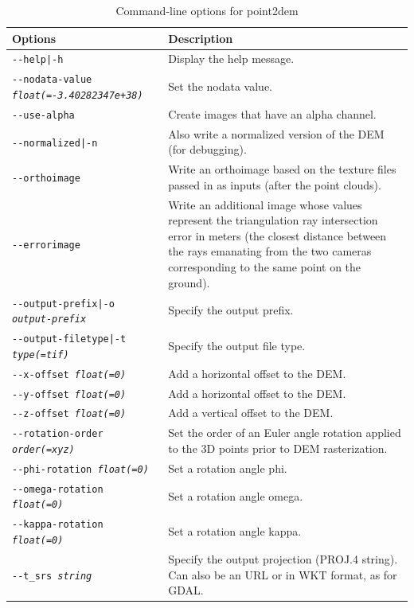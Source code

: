 \begin{longtable}{|p{8cm}|p{9cm}|}
\caption{Command-line options for point2dem}
\label{tbl:point2dem}
\endfirsthead
\endhead
\endfoot
\endlastfoot
\hline
Options & Description \\ \hline \hline
\texttt{-\/-help|-h} & Display the help message. \\ \hline
\texttt{-\/-nodata-value \textit{float(=-3.40282347e+38)}} & Set the nodata value. \\ \hline
\texttt{-\/-use-alpha} & Create images that have an alpha channel. \\ \hline
\texttt{-\/-normalized|-n} & Also write a normalized version of the \ac{DEM} (for debugging). \\ \hline
\texttt{-\/-orthoimage} & Write an orthoimage based on the texture files passed in as inputs (after the point clouds). \\ \hline
\texttt{-\/-errorimage} & Write an additional image whose values represent the triangulation ray intersection error in meters (the closest distance between the rays emanating from the two cameras corresponding to the same point on the ground). \\ \hline
\texttt{-\/-output-prefix|-o \textit{output-prefix}} & Specify the output prefix. \\ \hline
\texttt{-\/-output-filetype|-t \textit{type(=tif)}} & Specify the output file type. \\ \hline
\hline
\texttt{-\/-x-offset \textit{float(=0)}} & Add a horizontal offset to the \ac{DEM}. \\ \hline
\texttt{-\/-y-offset \textit{float(=0)}} & Add a horizontal offset to the \ac{DEM}. \\ \hline
\texttt{-\/-z-offset \textit{float(=0)}} & Add a vertical offset to the \ac{DEM}. \\ \hline
\texttt{-\/-rotation-order \textit{order(=xyz)}} & Set the order of an Euler angle rotation applied to the 3D points prior to \ac{DEM} rasterization. \\ \hline
\texttt{-\/-phi-rotation \textit{float(=0)}} & Set a rotation angle phi. \\ \hline
\texttt{-\/-omega-rotation \textit{float(=0)}} & Set a rotation angle omega. \\ \hline
\texttt{-\/-kappa-rotation \textit{float(=0)}} & Set a rotation angle kappa. \\ \hline
\hline
\texttt{-\/-t\_srs \textit{string}} & Specify the output projection (PROJ.4 string).  Can also be an URL or in WKT format, as for GDAL.\\ \hline

\end{longtable}
